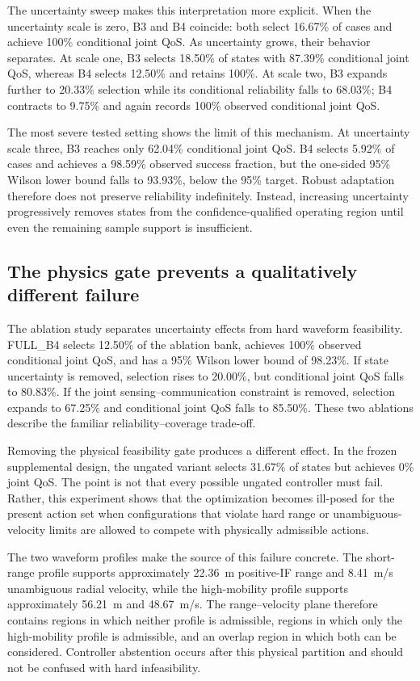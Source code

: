 The uncertainty sweep makes this interpretation more explicit. When the uncertainty scale is zero, B3 and B4 coincide: both select 16.67\% of cases and achieve 100\% conditional joint QoS. As uncertainty grows, their behavior separates. At scale one, B3 selects 18.50\% of states with 87.39\% conditional joint QoS, whereas B4 selects 12.50\% and retains 100\%. At scale two, B3 expands further to 20.33\% selection while its conditional reliability falls to 68.03\%; B4 contracts to 9.75\% and again records 100\% observed conditional joint QoS.

The most severe tested setting shows the limit of this mechanism. At uncertainty scale three, B3 reaches only 62.04\% conditional joint QoS. B4 selects 5.92\% of cases and achieves a 98.59\% observed success fraction, but the one-sided 95\% Wilson lower bound falls to 93.93\%, below the 95\% target. Robust adaptation therefore does not preserve reliability indefinitely. Instead, increasing uncertainty progressively removes states from the confidence-qualified operating region until even the remaining sample support is insufficient.

\subsection{The physics gate prevents a qualitatively different failure}

The ablation study separates uncertainty effects from hard waveform feasibility. FULL\_B4 selects 12.50\% of the ablation bank, achieves 100\% observed conditional joint QoS, and has a 95\% Wilson lower bound of 98.23\%. If state uncertainty is removed, selection rises to 20.00\%, but conditional joint QoS falls to 80.83\%. If the joint sensing--communication constraint is removed, selection expands to 67.25\% and conditional joint QoS falls to 85.50\%. These two ablations describe the familiar reliability--coverage trade-off.

Removing the physical feasibility gate produces a different effect. In the frozen supplemental design, the ungated variant selects 31.67\% of states but achieves 0\% joint QoS. The point is not that every possible ungated controller must fail. Rather, this experiment shows that the optimization becomes ill-posed for the present action set when configurations that violate hard range or unambiguous-velocity limits are allowed to compete with physically admissible actions.

The two waveform profiles make the source of this failure concrete. The short-range profile supports approximately 22.36~m positive-IF range and 8.41~m/s unambiguous radial velocity, while the high-mobility profile supports approximately 56.21~m and 48.67~m/s. The range--velocity plane therefore contains regions in which neither profile is admissible, regions in which only the high-mobility profile is admissible, and an overlap region in which both can be considered. Controller abstention occurs after this physical partition and should not be confused with hard infeasibility.


